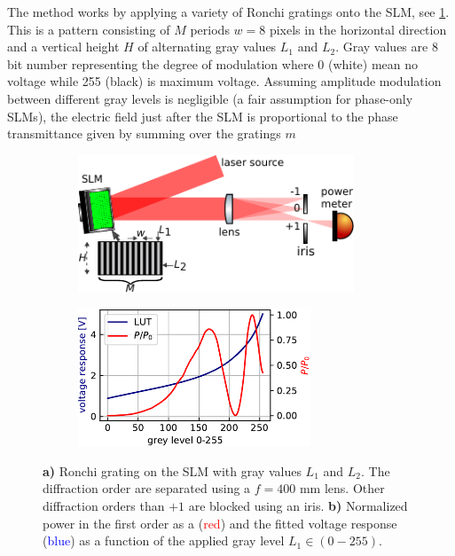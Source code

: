 The method works by applying a variety of Ronchi gratings onto the SLM, see \cref{fig:LUTCalibrationSetup}.
This is a pattern consisting of $M$ periods $w=8$ pixels in the horizontal direction and a vertical height $H$ of alternating gray values $L_1$ and $L_2$.
Gray values are 8 bit number representing the degree of modulation where 0 (white) mean no voltage while 255 (black) is maximum voltage. 
Assuming amplitude modulation between different gray levels is negligible (a fair assumption for phase-only SLMs), the electric field just after the SLM is proportional to the phase transmittance given by summing over the gratings $m$ \cite{Zhang1994}

\begin{figure}
	\begin{subfigure}{.54\linewidth}
		\flushleft
		\includegraphics[height=4.1cm]{figures/LUTcalibrationSetup.pdf}
		\caption{}
		\label{fig:LUTCalibrationSetup}
	\end{subfigure}
	\hfill
	\begin{subfigure}{.45\linewidth}
		\flushright
		\includegraphics[height=4.1cm]{figures/LUTplot.pdf}
		\caption{}
		\label{fig:LUTcalibration}
	\end{subfigure}
	\caption{\textbf{a)} Ronchi grating on the SLM with gray values $L_1$ and $L_2$. 
	The diffraction order are separated using a $f=400$ mm lens. 
	Other diffraction orders than $+1$ are blocked using an iris. 
	\textbf{b)} Normalized power in the first order as a (\textcolor{red}{red}) and the fitted voltage response (\textcolor{blue}{blue}) as a function of the applied gray level $L_1 \in (0-255)$.}
\end{figure}

